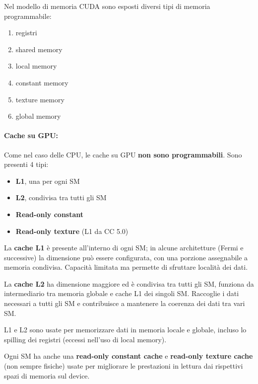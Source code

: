 Nel modello di memoria CUDA sono esposti diversi tipi di memoria programmabile: 
\begin{enumerate}
	\item registri

	\item shared memory

	\item local memory

	\item constant memory

	\item texture memory

	\item global memory
\end{enumerate}

\paragraph{Cache su GPU:} Come nel caso delle CPU, le cache su GPU \textbf{non sono programmabili}. Sono presenti 4 tipi:
\begin{itemize}
	\item \textbf{L1}, una per ogni SM
	
	\item \textbf{L2}, condivisa tra tutti gli SM
	
	\item \textbf{Read-only constant}
	
	\item \textbf{Read-only texture} (L1 da CC 5.0)
\end{itemize}

La \textbf{cache L1} è presente all'interno di ogni SM; in alcune architetture (Fermi e successive) la dimensione può essere configurata, con una porzione assegnabile a memoria condivisa. Capacità limitata ma permette di sfruttare località dei dati.

La \textbf{cache L2} ha dimensione maggiore ed è condivisa tra tutti gli SM, funziona da intermediario tra memoria globale e cache L1 dei singoli SM. Raccoglie i dati necessari a tutti gli SM e contribuisce a mantenere la coerenza dei dati tra vari SM.

L1 e L2 sono usate per memorizzare dati in memoria locale e globale, incluso lo spilling dei registri (eccessi nell'uso di local memory).

Ogni SM ha anche una \textbf{read-only constant cache} e \textbf{read-only texture cache} (non sempre fisiche) usate per migliorare le prestazioni in lettura dai rispettivi spazi di memoria sul device.

